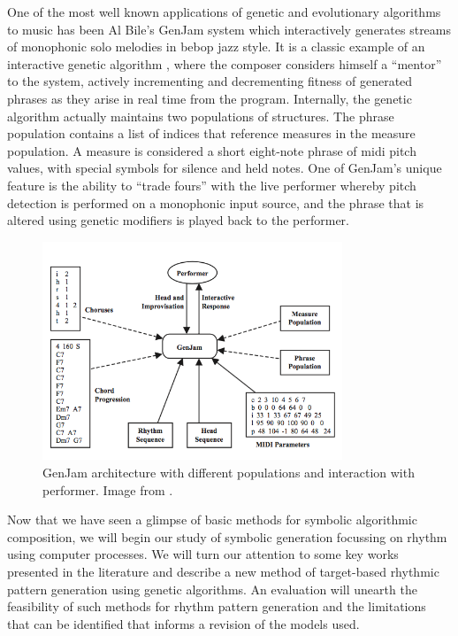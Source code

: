 One of the most well known applications of genetic and evolutionary algorithms to music has been Al Bile’s GenJam system \citep{Biles1994,Biles2002,  Biles2003, Biles2007} which interactively generates streams of monophonic solo melodies in bebop jazz style.  It is a classic example of an interactive genetic algorithm , where the composer considers himself a “mentor” to the system, actively incrementing and decrementing fitness of generated phrases as they arise in real time from the program. Internally, the genetic algorithm actually maintains two populations of structures. The phrase population contains a list of indices that reference measures in the measure population. A measure is considered a short eight-note phrase of \acrshort{midi} pitch values, with special symbols for silence and held notes.  One of GenJam's unique feature is the ability to “trade fours” with the live performer whereby pitch detection is performed on a monophonic input source, and the phrase that is altered using genetic modifiers is played back to the performer.

\begin{figure}
	\begin{center}
		\includegraphics[width=0.8\textwidth]{ch03_symbolic/figures/genjam.png}
	\end{center}
	\caption[GenJam architecture]{GenJam architecture with different populations and interaction with performer. Image from \cite{Miranda2007a}.}
	\label{fig:genjam}
\end{figure}

Now that we have seen a glimpse of basic methods for symbolic algorithmic composition, we will begin our study of symbolic generation focussing on rhythm using computer processes. We will turn our attention to some key works presented in the literature and describe a new method of target-based rhythmic pattern generation using genetic algorithms. An evaluation will unearth the feasibility of such methods for rhythm pattern generation and the limitations that can be identified that informs a revision of the models used.\

